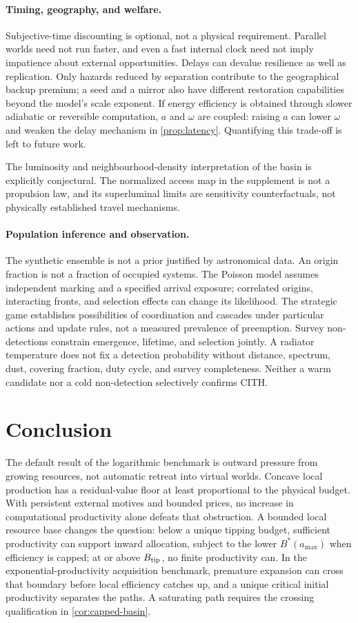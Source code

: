 \documentclass[11pt,a4paper]{article}
\theoremstyle{definition}\newtheorem{definition}{Definition}
\newcommand{\CITH}{\textsc{CITH}}
\begin{document}
\paragraph{Timing, geography, and welfare.}
Subjective-time discounting is optional, not a physical requirement.
Parallel worlds need not run faster, and even a fast internal clock need
not imply impatience about external opportunities. Delays can devalue
resilience as well as replication. Only hazards reduced by separation
contribute to the geographical backup premium; a seed and a mirror also
have different restoration capabilities beyond the model's scale exponent.
If energy efficiency is obtained through slower adiabatic or reversible
computation, $a$ and $\omega$ are coupled: raising $a$ can lower $\omega$
and weaken the delay mechanism in \cref{prop:latency}. Quantifying this
trade-off is left to future work.

The luminosity and neighbourhood-density interpretation of the basin is
explicitly conjectural. The normalized access map in the supplement is
not a propulsion law, and its superluminal limits are sensitivity
counterfactuals, not physically established travel mechanisms.

\paragraph{Population inference and observation.}
The synthetic ensemble is not a prior justified by astronomical data.
An origin fraction is not a fraction of occupied systems. The Poisson
model assumes independent marking and a specified arrival exposure;
correlated origins, interacting fronts, and selection effects can change
its likelihood. The strategic game establishes possibilities of
coordination and cascades under particular actions and update rules,
not a measured prevalence of preemption. Survey non-detections constrain
emergence, lifetime, and selection jointly. A radiator temperature does
not fix a detection probability without distance, spectrum, dust,
covering fraction, duty cycle, and survey completeness. Neither a warm
candidate nor a cold non-detection selectively confirms \CITH.

\section{Conclusion}
\label{sec:conclusion}
The default result of the logarithmic benchmark is outward pressure from
growing resources, not automatic retreat into virtual worlds. Concave
local production has a residual-value floor at least proportional to
the physical budget. With persistent external motives and bounded prices,
no increase in computational productivity alone defeats that obstruction.
A bounded local resource base changes the question: below a unique tipping
budget, sufficient productivity can support inward allocation, subject to
the lower $B^*(a_{\max})$ when efficiency is capped; at or above
$B_{\rm tip}$, no finite productivity can. In the exponential-productivity acquisition benchmark,
premature expansion can cross that boundary before local efficiency
catches up, and a unique critical initial productivity separates the paths.
A saturating path requires the crossing qualification in \cref{cor:capped-basin}.
\end{document}
